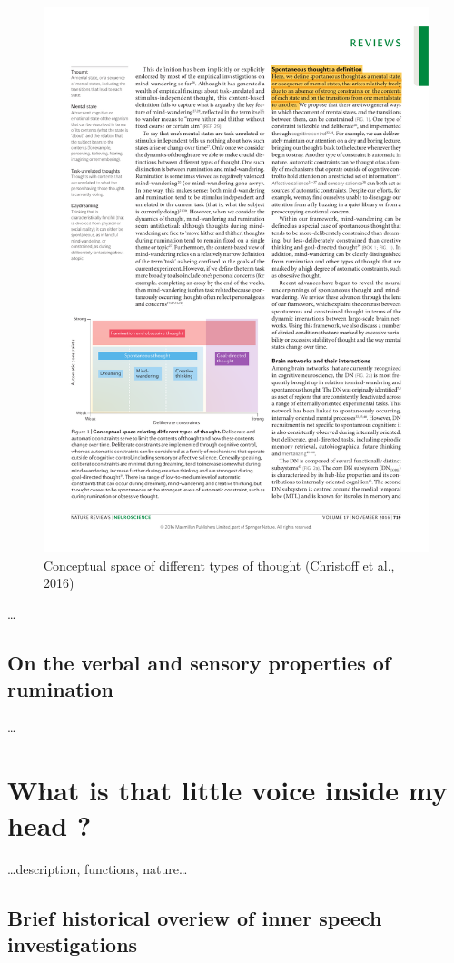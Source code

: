 \documentclass[a4paper,12pt,twoside,openright,oldfontcommands]{memoir}
\begin{document}
\begin{figure}

{\centering \includegraphics[width=0.75\linewidth]{assets/conceptual_space} 

}

\caption{Conceptual space of different types of thought (Christoff et al., 2016)}\label{fig:conceptual}
\end{figure}

\ldots{}

\subsection{On the verbal and sensory properties of
rumination}\label{on-the-verbal-and-sensory-properties-of-rumination}

\ldots{}

\section{What is that little voice inside my head
?}\label{what-is-that-little-voice-inside-my-head}

\ldots{}description, functions, nature\ldots{}

\subsection{Brief historical overiew of inner speech
investigations}\label{brief-historical-overiew-of-inner-speech-investigations}
\end{document}
